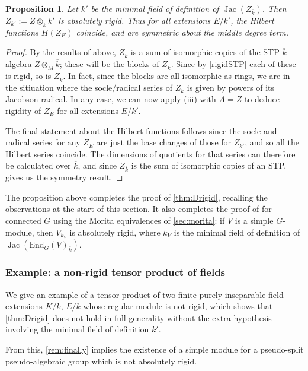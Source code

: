 \documentclass[11pt,reqno]{amsart}
\newtheorem{prop}[lemma]{Proposition}
\theoremstyle{definition}
\theoremstyle{remark}
\theoremstyle{definition}
\theoremstyle{plain}
\DeclareMathOperator{\Jac}{Jac}
\newcommand{\End}{\mathrm{End}}
\newcommand{\bark}{{\overline{k}}}
\begin{document}
\begin{prop}\label{stp}
Let $k'$ be the minimal field of definition of $\Jac(Z_\bark)$.
Then $Z_{k'} := Z\otimes_k k'$ is absolutely rigid.
Thus for all extensions $E/k'$, the Hilbert functions $H(Z_E)$ coincide, and are symmetric about the middle degree term.
\end{prop}

\begin{proof}
By the results of \cite{rasala} above, $Z_\bark$ is a sum of isomorphic copies of the STP $\bark$-algebra $Z\otimes_M \bark$;
these will be the blocks of $Z_\bark$.
Since by \cref{rigidSTP} each of these is rigid, so is $Z_\bark$. 
In fact, since the blocks are all isomorphic as rings, we are in the sitiuation where the socle/radical series of $Z_\bark$ is given by powers of its Jacobson radical.
In any case, we can now apply 
(iii) with $A=Z$ to deduce rigidity of $Z_E$ for all extensions $E/k'$.

The final statement about the Hilbert functions follows since the socle and radical series for any $Z_E$ are just the base changes of those for $Z_{k'}$, and 
so all the Hilbert series coincide.
The dimensions of quotients for that series can therefore be calculated over $\bark$, and since $Z_\bark$ is the sum of isomorphic copies of an STP,  gives us the symmetry result.
\end{proof}

The proposition above completes the proof of \cref{thm:Drigid}, recalling the observations at the start of this section. It also completes the proof of  for connected $G$ using the Morita equivalences of \cref{sec:morita}:
if $V$ is a simple $G$-module, then $V_{k_V}$ is absolutely rigid,
where $k_V$ is the minimal field of definition of $\Jac(\End_G(V)_\bark)$.

\subsubsection{Example: a non-rigid tensor product of fields}
We give an example of a tensor product of two finite purely inseparable field extensions $K/k$, $E/k$ whose regular module is not rigid,
which shows that \cref{thm:Drigid} does not hold in full generality without the extra hypothesis involving the minimal field of definition $k'$.

From this, \cref{rem:finally} implies the existence of a simple module for a pseudo-split pseudo-algebraic group which is not absolutely rigid.
\end{document}

